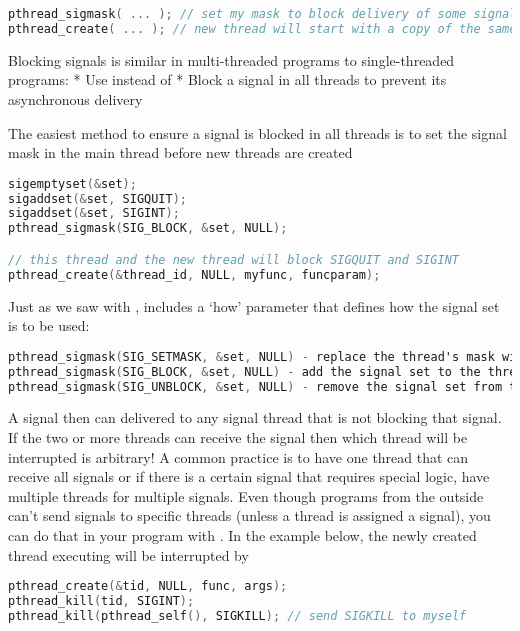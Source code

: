 \begin{lstlisting}[language=C]
pthread_sigmask( ... ); // set my mask to block delivery of some signals
pthread_create( ... ); // new thread will start with a copy of the same mask
\end{lstlisting}

Blocking signals is similar in multi-threaded programs to single-threaded programs:
* Use  instead of 
* Block a signal in all threads to prevent its asynchronous delivery

The easiest method to ensure a signal is blocked in all threads is to set the signal mask in the main thread before new threads are created

\begin{lstlisting}[language=C]
sigemptyset(&set);
sigaddset(&set, SIGQUIT);
sigaddset(&set, SIGINT);
pthread_sigmask(SIG_BLOCK, &set, NULL);

// this thread and the new thread will block SIGQUIT and SIGINT
pthread_create(&thread_id, NULL, myfunc, funcparam);
\end{lstlisting}

Just as we saw with ,  includes a `how' parameter that defines how the signal set is to be used:

\begin{lstlisting}[language=C]
pthread_sigmask(SIG_SETMASK, &set, NULL) - replace the thread's mask with given signal set
pthread_sigmask(SIG_BLOCK, &set, NULL) - add the signal set to the thread's mask
pthread_sigmask(SIG_UNBLOCK, &set, NULL) - remove the signal set from the thread's mask
\end{lstlisting}

A signal then can delivered to any signal thread that is not blocking that signal. If the two or more threads can receive the signal then which thread will be interrupted is arbitrary! A common practice is to have one thread that can receive all signals or if there is a certain signal that requires special logic, have multiple threads for multiple signals. Even though programs from the outside can't send signals to specific threads (unless a thread is assigned a signal), you can do that in your program with . In the example below, the newly created thread executing  will be interrupted by 

\begin{lstlisting}[language=C]
pthread_create(&tid, NULL, func, args);
pthread_kill(tid, SIGINT);
pthread_kill(pthread_self(), SIGKILL); // send SIGKILL to myself
\end{lstlisting}

